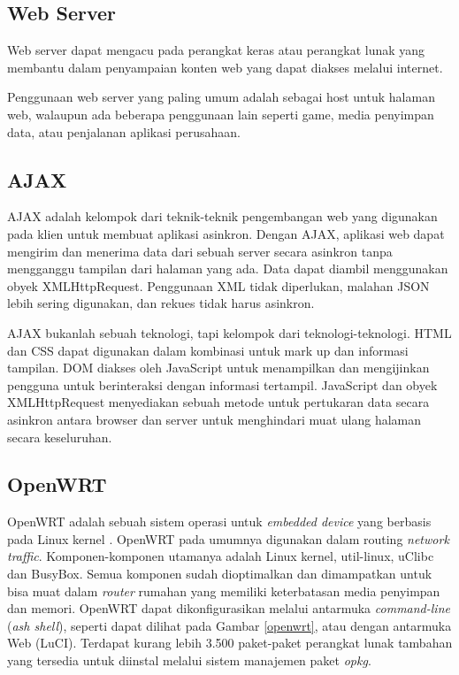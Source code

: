   \subsection{Web Server}
    Web server dapat mengacu pada perangkat keras atau perangkat lunak yang membantu dalam penyampaian konten web yang dapat diakses melalui internet.

    Penggunaan web server yang paling umum adalah sebagai host untuk halaman web, walaupun ada beberapa penggunaan lain seperti game, media penyimpan data, atau penjalanan aplikasi perusahaan.


  \subsection{AJAX}
    AJAX adalah kelompok dari teknik-teknik pengembangan web yang digunakan pada klien untuk membuat aplikasi asinkron. Dengan AJAX, aplikasi web dapat mengirim dan menerima data dari sebuah server secara asinkron tanpa mengganggu tampilan dari halaman yang ada. Data dapat diambil menggunakan obyek XMLHttpRequest. Penggunaan XML tidak diperlukan, malahan JSON lebih sering digunakan, dan rekues tidak harus asinkron.

    AJAX bukanlah sebuah teknologi, tapi kelompok dari teknologi-teknologi. HTML dan CSS dapat digunakan dalam kombinasi untuk mark up dan informasi tampilan. DOM diakses oleh JavaScript untuk menampilkan dan mengijinkan pengguna untuk berinteraksi dengan informasi tertampil. JavaScript dan obyek XMLHttpRequest menyediakan sebuah metode untuk pertukaran data secara asinkron antara browser dan server untuk menghindari muat ulang halaman secara keseluruhan.


  \subsection{OpenWRT}
    OpenWRT adalah sebuah sistem operasi untuk \emph{embedded device} yang berbasis pada Linux kernel \cite{Hwang2003}. OpenWRT pada umumnya digunakan dalam routing \emph{network traffic}. Komponen-komponen utamanya adalah Linux kernel, util-linux, uClibc dan BusyBox. Semua komponen sudah dioptimalkan dan dimampatkan untuk bisa muat dalam \emph{router} rumahan yang memiliki keterbatasan media penyimpan dan memori. OpenWRT dapat dikonfigurasikan melalui antarmuka \emph{command-line} (\emph{ash shell}), seperti dapat dilihat pada Gambar \ref{openwrt}, atau dengan antarmuka Web (LuCI). Terdapat kurang lebih 3.500 paket-paket perangkat lunak tambahan yang tersedia untuk diinstal melalui sistem manajemen paket \emph{opkg}.

